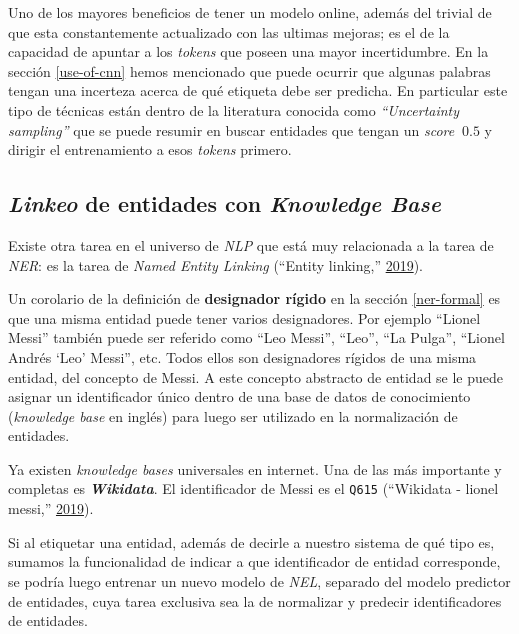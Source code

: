 \documentclass[12pt,a4paper,]{scrartcl}
\begin{document}
Uno de los mayores beneficios de tener un modelo online, además del trivial de que esta constantemente actualizado con las ultimas mejoras; es el de la capacidad de apuntar a los \emph{tokens} que poseen una mayor incertidumbre. En la sección \ref{use-of-cnn} hemos mencionado que puede ocurrir que algunas palabras tengan una incerteza acerca de qué etiqueta debe ser predicha. En particular este tipo de técnicas están dentro de la literatura conocida como \emph{\enquote{Uncertainty sampling}} que se puede resumir en buscar entidades que tengan un \emph{score} \(~ 0.5\) y dirigir el entrenamiento a esos \emph{tokens} primero.

\hypertarget{linkeo-de-entidades-con-knowledge-base}{%
\subsection{\texorpdfstring{\emph{Linkeo} de entidades con \emph{Knowledge Base}}{Linkeo de entidades con Knowledge Base}}\label{linkeo-de-entidades-con-knowledge-base}}

Existe otra tarea en el universo de \emph{NLP} que está muy relacionada a la tarea de \emph{NER}: es la tarea de \emph{Named Entity Linking} (``Entity linking,'' \protect\hyperlink{ref-wiki_nel}{2019}).

Un corolario de la definición de \textbf{designador rígido} en la sección \ref{ner-formal} es que una misma entidad puede tener varios designadores. Por ejemplo \enquote{Lionel Messi} también puede ser referido como \enquote{Leo Messi}, \enquote{Leo}, \enquote{La Pulga}, \enquote{Lionel Andrés \enquote{Leo} Messi}, etc. Todos ellos son designadores rígidos de una misma entidad, del concepto de Messi. A este concepto abstracto de entidad se le puede asignar un identificador único dentro de una base de datos de conocimiento (\emph{knowledge base} en inglés) para luego ser utilizado en la normalización de entidades.

Ya existen \emph{knowledge bases} universales en internet. Una de las más importante y completas es \textbf{\emph{Wikidata}}. El identificador de Messi es el \texttt{Q615} (``Wikidata - lionel messi,'' \protect\hyperlink{ref-wikidata_messi}{2019}).

Si al etiquetar una entidad, además de decirle a nuestro sistema de qué tipo es, sumamos la funcionalidad de indicar a que identificador de entidad corresponde, se podría luego entrenar un nuevo modelo de \emph{NEL}, separado del modelo predictor de entidades, cuya tarea exclusiva sea la de normalizar y predecir identificadores de entidades.
\end{document}
